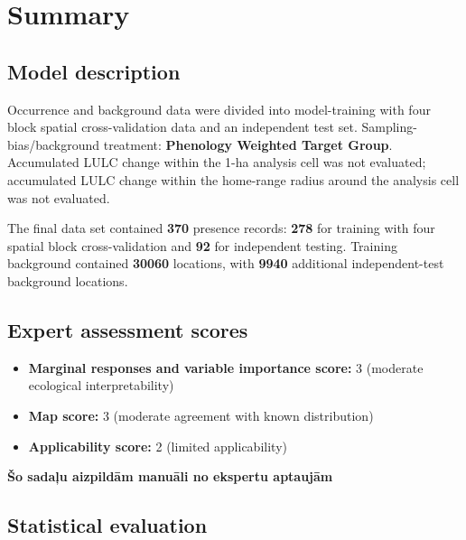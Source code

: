 \documentclass[
  openany]{book}
\providecommand{\tightlist}{%
  \setlength{\itemsep}{0pt}\setlength{\parskip}{0pt}}
\providecommand{\tightlist}{%
  \setlength{\itemsep}{0pt}%
  \setlength{\parskip}{0pt}%
}
\begin{document}
\section*{Summary}\label{summary-15}

\subsection*{Model description}\label{model-description-15}

Occurrence and background data were divided into model-training with four block spatial cross-validation data and an independent test set. Sampling-bias/background treatment: \textbf{Phenology Weighted Target Group}. Accumulated LULC change within the 1-ha analysis cell was not evaluated; accumulated LULC change within the home-range radius around the analysis cell was not evaluated.

The final data set contained \textbf{370} presence records: \textbf{278} for training with four spatial block cross-validation and \textbf{92} for independent testing. Training background contained \textbf{30060} locations, with \textbf{9940} additional independent-test background locations.

\subsection*{Expert assessment scores}\label{expert-assessment-scores-15}

\begin{itemize}
\tightlist
\item
  \textbf{Marginal responses and variable importance score:} 3 (moderate ecological interpretability)
\item
  \textbf{Map score:} 3 (moderate agreement with known distribution)
\item
  \textbf{Applicability score:} 2 (limited applicability)
\end{itemize}

\textbf{Šo sadaļu aizpildām manuāli no ekspertu aptaujām}

\subsection*{Statistical evaluation}\label{statistical-evaluation-15}
\end{document}
